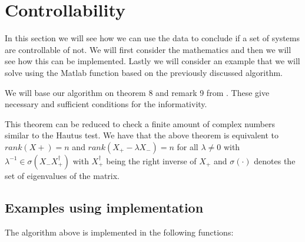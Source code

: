\section{Controllability}
In this section we will see how we can use the data to conclude if a set of systems are controllable of not. We will first consider the mathematics and then we will see how this can be implemented. Lastly we will consider an example that we will solve using the Matlab function based on the previously discussed algorithm.


We will base our algorithm on theorem 8 and remark 9 from \cite{waarde2019data}. These give necessary and sufficient conditions for the informativity.


This theorem can be reduced to check a finite amount of complex numbers similar to the Hautus test. We have that the above theorem is equivalent to $rank(X+) = n$ and $rank(X_+ - \lambda X_-) = n$ for all $\lambda \neq 0$ with $\lambda^{-1} \in \sigma(X_- X_+^\dagger)$ with $X_+^\dagger$ being the right inverse of $X_+$ and $\sigma(\cdot)$ denotes the set of eigenvalues of the matrix.



\subsection{Examples using implementation}
The algorithm above is implemented in the following functions:
